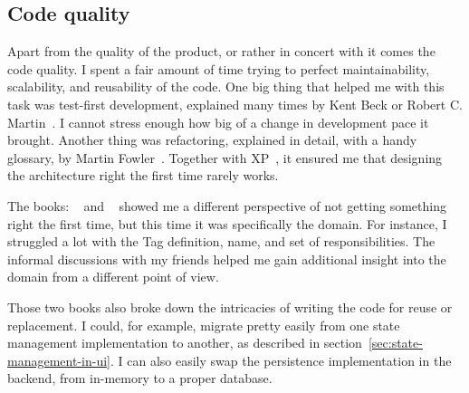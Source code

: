 \subsection{Code quality}\label{sec:code-quality}

Apart from the quality of the product,
or rather in concert with it
comes the code quality.
I spent a fair amount of time trying
to perfect maintainability,
scalability,
and reusability of the code.
One big thing that helped me with this task
was test-first development,
explained many times by Kent Beck or
Robert C. Martin~\cite{beck_extreme_2004,beck_test-driven_2002,martin_clean_2011}.
I cannot stress enough how big
of a change in development pace it brought.
Another thing was refactoring,
explained in detail,
with a handy glossary,
by Martin Fowler~\cite{fowler_refactoring_2019}.
Together with \ac{XP}~\cite{beck_extreme_2004},
it ensured me that designing the architecture right
the first time rarely works.

The books:
~\cite{millett_patterns_2015}
and ~\cite{evans_domain-driven_2003}
showed me a different perspective
of not getting something right the first time,
but this time it was specifically the domain.
For instance,
I struggled a lot with the Tag definition,
name, and set of responsibilities.
The informal discussions with my friends
helped me gain additional insight into the domain
from a different point of view.

Those two books also broke down the intricacies
of writing the code for reuse or replacement.
I could, for example,
migrate pretty easily
from one state management implementation to another,
as described in section~\ref{sec:state-management-in-ui}.
I can also easily swap
the persistence implementation in the backend,
from in-memory to a proper database.
